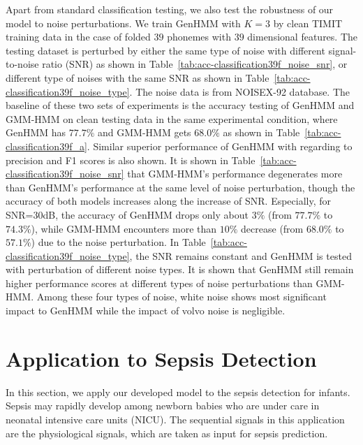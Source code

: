 Apart from standard classification testing, we also test the robustness of our model to noise perturbations. We train GenHMM with $K=3$ by clean TIMIT training data in the case of folded $39$ phonemes with $39$ dimensional features. The testing dataset is perturbed by either the same type of noise with different signal-to-noise ratio (SNR) as shown in Table~\ref{tab:acc-classification39f_noise_snr}, or different type of noises with the same SNR as shown in Table~\ref{tab:acc-classification39f_noise_type}. The noise data is from NOISEX-92 database. The baseline of these two sets of experiments is the accuracy testing of GenHMM and GMM-HMM on clean testing data in the same experimental condition, where GenHMM has $77.7\%$ and GMM-HMM gets $68.0\%$ as shown in Table~\ref{tab:acc-classification39f_a}. Similar superior performance of GenHMM with regarding to precision and F1 scores is also shown. It is shown in Table~\ref{tab:acc-classification39f_noise_snr} that GMM-HMM's performance degenerates more than GenHMM's performance at the same level of noise perturbation, though the accuracy of both models increases along the increase of SNR. Especially, for SNR=$30$dB, the accuracy of GenHMM drops only about $3\%$ (from $77.7\%$ to $74.3\%$), while GMM-HMM encounters more than $10\%$ decrease (from $68.0\%$ to $57.1\%$) due to the noise perturbation. In Table~\ref{tab:acc-classification39f_noise_type}, the SNR remains constant and GenHMM is tested with perturbation of different noise types. It is shown that GenHMM still remain higher performance scores at different types of noise perturbations than GMM-HMM. Among these four types of noise, white noise shows most significant impact to GenHMM while the impact of volvo noise is negligible.


\section{Application to Sepsis Detection}
In this section, we apply our developed model to the sepsis detection for infants. Sepsis may rapidly develop among newborn babies who are under care in neonatal intensive care units (NICU). The sequential signals in this application are the physiological signals, which are taken as input for
sepsis prediction.

